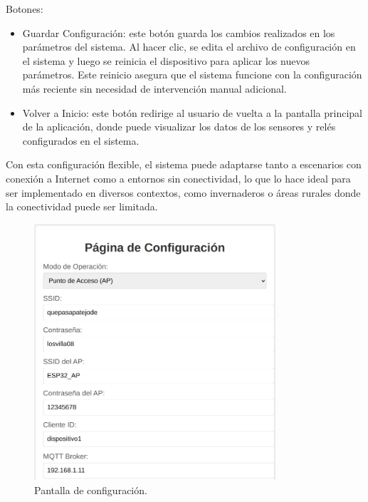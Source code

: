 Botones:
\begin{itemize}
	\item Guardar Configuración: este botón guarda los cambios realizados en los parámetros del sistema. Al hacer clic, se edita el archivo de configuración en el sistema y luego se reinicia el dispositivo para aplicar los nuevos parámetros. Este reinicio asegura que el sistema funcione con la configuración más reciente sin necesidad de intervención manual adicional.
	\item Volver a Inicio: este botón redirige al usuario de vuelta a la pantalla principal de la aplicación, donde puede visualizar los datos de los sensores y relés configurados en el sistema.
\end{itemize}

Con esta configuración flexible, el sistema puede adaptarse tanto a escenarios con conexión a Internet como a entornos sin conectividad, lo que lo hace ideal para ser implementado en diversos contextos, como invernaderos o áreas rurales donde la conectividad puede ser limitada.


\begin{figure}[H]
\centering 
\includegraphics[width=0.8\textwidth]{./Figures/config_1.png}
\caption{Pantalla de configuración.}
\label{fig:config_1}
\end{figure}


